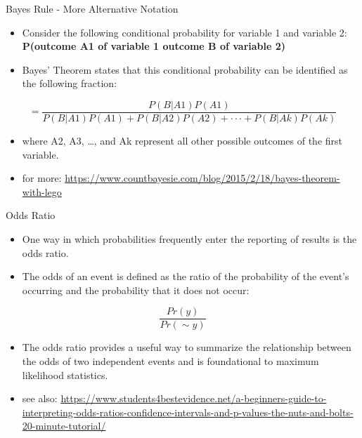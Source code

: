 \documentclass[
  ignorenonframetext,
]{beamer}
\begin{document}
\begin{frame}{Bayes Rule - More Alternative Notation}
\protect\hypertarget{bayes-rule---more-alternative-notation}{}

\begin{itemize}
\item
  Consider the following conditional probability for variable 1 and
  variable 2: \textbf{P(outcome A1 of variable 1 \textbar{} outcome B of
  variable 2)}
\item
  Bayes' Theorem states that this conditional probability can be
  identified as the following fraction:
\end{itemize}

\[=\frac{P(B|A1)P(A1)}{P(B|A1)P(A1)+P(B|A2)P(A2)+···+P(B|Ak)P(Ak)}\]

\begin{itemize}
\item
  where A2, A3, \ldots, and Ak represent all other possible outcomes of
  the first variable.
\item
  for more:
  \url{https://www.countbayesie.com/blog/2015/2/18/bayes-theorem-with-lego}
\end{itemize}

\end{frame}

\begin{frame}{Odds Ratio}
\protect\hypertarget{odds-ratio}{}

\begin{itemize}
\item
  One way in which probabilities frequently enter the reporting of
  results is the odds ratio.
\item
  The odds of an event is defined as the ratio of the probability of the
  event's occurring and the probability that it does not occur:
\end{itemize}

\[\frac{Pr(y)}{Pr(\sim y)}\]

\begin{itemize}
\item
  The odds ratio provides a useful way to summarize the relationship
  between the odds of two independent events and is foundational to
  maximum likelihood statistics.
\item
  see also:
  \url{https://www.students4bestevidence.net/a-beginners-guide-to-interpreting-odds-ratios-confidence-intervals-and-p-values-the-nuts-and-bolts-20-minute-tutorial/}
\end{itemize}

\end{frame}
\end{document}
